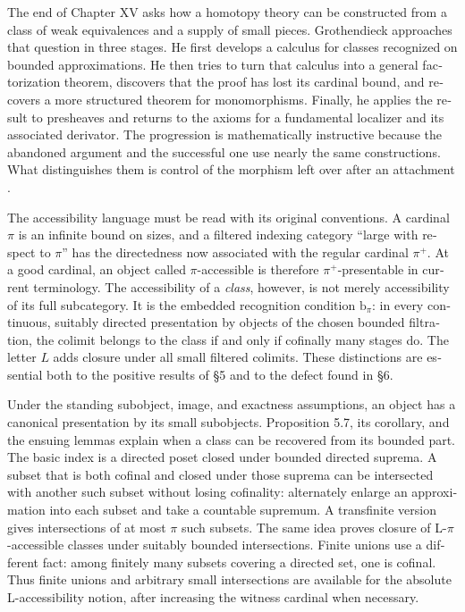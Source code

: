 \begin{otherlanguage}{english}
\begin{otherlanguage}{english}
The end of Chapter XV asks how a homotopy theory can be constructed from a class of weak equivalences and a supply of small pieces. Grothendieck approaches that question in three stages. He first develops a calculus for classes recognized on bounded approximations. He then tries to turn that calculus into a general factorization theorem, discovers that the proof has lost its cardinal bound, and recovers a more structured theorem for monomorphisms. Finally, he applies the result to presheaves and returns to the axioms for a fundamental localizer and its associated derivator. The progression is mathematically instructive because the abandoned argument and the successful one use nearly the same constructions. What distinguishes them is control of the morphism left over after an attachment \citep{Grothendieck1990XV}.

The accessibility language must be read with its original conventions. A cardinal $\pi$ is an infinite bound on sizes, and a filtered indexing category “large with respect to $\pi$” has the directedness now associated with the regular cardinal $\pi^+$. At a good cardinal, an object called $\pi$-accessible is therefore $\pi^+$-presentable in current terminology. The accessibility of a \emph{class}, however, is not merely accessibility of its full subcategory. It is the embedded recognition condition $\mathrm b_\pi$: in every continuous, suitably directed presentation by objects of the chosen bounded filtration, the colimit belongs to the class if and only if cofinally many stages do. The letter $L$ adds closure under all small filtered colimits. These distinctions are essential both to the positive results of \S5 and to the defect found in \S6.

Under the standing subobject, image, and exactness assumptions, an object has a canonical presentation by its small subobjects. Proposition 5.7, its corollary, and the ensuing lemmas explain when a class can be recovered from its bounded part. The basic index is a directed poset closed under bounded directed suprema. A subset that is both cofinal and closed under those suprema can be intersected with another such subset without losing cofinality: alternately enlarge an approximation into each subset and take a countable supremum. A transfinite version gives intersections of at most $\pi$ such subsets. The same idea proves closure of L-$\pi$-accessible classes under suitably bounded intersections. Finite unions use a different fact: among finitely many subsets covering a directed set, one is cofinal. Thus finite unions and arbitrary small intersections are available for the absolute L-accessibility notion, after increasing the witness cardinal when necessary.


\end{otherlanguage}
\end{otherlanguage}
